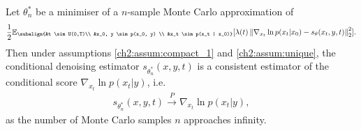 \begin{customcoll}{1}
    Let $\theta_n^\ast$ be a minimiser of a $n$-sample Monte Carlo approximation of \begin{gather*}
        \begin{aligned}
                \frac{1}{2} \mathbb{E}_{\subalign{&t \sim U(0,T)\\ &x_0, y \sim p(x_0, y) \\ &x_t \sim p(x_t | x_0)}} 
                [\lambda(t) \norm{\nabla_{x_t} \ln{p(x_t | x_0)} - s_\theta(x_t, y, t)}_2^2].
        \end{aligned}
        \end{gather*} 
        Then under assumptions \ref{ch2:assum:compact_1} and \ref{ch2:assum:unique}, the conditional denoising estimator $s_{\theta_n^\ast}(x,y,t)$ is a consistent estimator of the conditional score $\nabla_{x_t} \ln p(x_t | y)$, i.e.
    \begin{gather*}
        s_{\theta_n^\ast}(x,y,t) \overset{P}{\to} \nabla_{x_t} \ln p(x_t | y),
    \end{gather*}
    as the number of Monte Carlo samples $n$ approaches infinity.
\end{customcoll}

